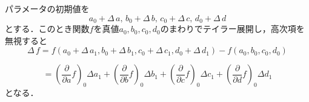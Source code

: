 
パラメータの初期値を
\begin{equation*}
a_{{0}}+\Delta\,a,\,b_{{0}}+\Delta\,b,\,c_{{0}}+\Delta\,c,\,d_{{0}}+\Delta\,d
\end{equation*}
とする．このとき関数$f$を真値$a_0, b_0, c_0, d_0$のまわりでテイラー展開し，高次項を無視すると
\begin{equation*}
\Delta\,f=f \left( a_{{0}}+\Delta\,a_{{1}},b_{{0}}+\Delta\,b_{{1}},c_{{0}}+\Delta\,c_{{1}},d_{{0}}+\Delta\,d_{{1}} \right) -f \left( a_{{0}},b_{{0}},c_{{0}},d_{{0}} \right)
\end{equation*}

\begin{equation*}
=\left(\frac{\partial }{\partial a }f \right)_{0}\Delta a _{1}+\left(\frac{\partial }{\partial b }f \right)_{0}\Delta b _{1}+\left(\frac{\partial }{\partial c }f \right)_{0}\Delta c _{1}+\left(\frac{\partial }{\partial d }f \right)_{0}\Delta d _{1}
\end{equation*}
となる．

